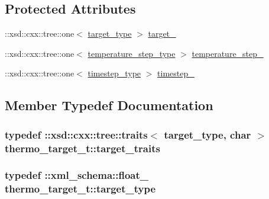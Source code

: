 \subsection*{Protected Attributes}
\begin{DoxyCompactItemize}
\item 
\+::xsd\+::cxx\+::tree\+::one$<$ \hyperlink{classthermo__target__t_af968c613cbe6e33fcd41b038cefe1f0a}{target\+\_\+type} $>$ \hyperlink{classthermo__target__t_a4a823b4e7d42679c8ae83cff93763cf3}{target\+\_\+}
\item 
\+::xsd\+::cxx\+::tree\+::one$<$ \hyperlink{classthermo__target__t_a55faae5a0c7af8d0e9567600150603b3}{temperature\+\_\+step\+\_\+type} $>$ \hyperlink{classthermo__target__t_a235f5881ea574b7a2fe9c99a7e8355d8}{temperature\+\_\+step\+\_\+}
\item 
\+::xsd\+::cxx\+::tree\+::one$<$ \hyperlink{classthermo__target__t_a37e1805b2e121c0e0b0a97b2f5d1dfcb}{timestep\+\_\+type} $>$ \hyperlink{classthermo__target__t_ad1a9748cb191953440a11daf88753803}{timestep\+\_\+}
\end{DoxyCompactItemize}


\subsection{Member Typedef Documentation}
\subsubsection[{\texorpdfstring{target\+\_\+traits}{target_traits}}]{\setlength{\rightskip}{0pt plus 5cm}typedef \+::xsd\+::cxx\+::tree\+::traits$<$ {\bf target\+\_\+type}, char $>$ {\bf thermo\+\_\+target\+\_\+t\+::target\+\_\+traits}}\hypertarget{classthermo__target__t_a560deecfd869cf48273f19845ab11324}{}\label{classthermo__target__t_a560deecfd869cf48273f19845ab11324}
\subsubsection[{\texorpdfstring{target\+\_\+type}{target_type}}]{\setlength{\rightskip}{0pt plus 5cm}typedef \+::{\bf xml\+\_\+schema\+::float\+\_\+} {\bf thermo\+\_\+target\+\_\+t\+::target\+\_\+type}}\hypertarget{classthermo__target__t_af968c613cbe6e33fcd41b038cefe1f0a}{}\label{classthermo__target__t_af968c613cbe6e33fcd41b038cefe1f0a}
